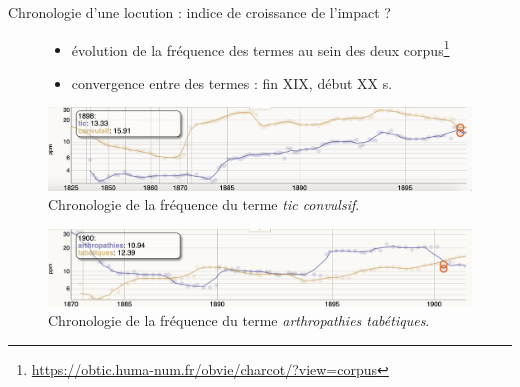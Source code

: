 \documentclass[xcolor={table,usenames,dvipsnames}]{beamer}
\let\olditem\item
\renewcommand{\item}{%
\olditem\vspace{0pt}}
\begin{document}
\begin{frame}{Chronologie d'une locution : indice de croissance de l'impact ?}
\begin{figure}[h] %
	\begin{itemize}
		\item évolution de la fréquence des termes au sein des deux corpus\footnote{\url{https://obtic.huma-num.fr/obvie/charcot/?view=corpus}}
		\item convergence entre des termes : fin \textsc{XIX}\ieme{}, début \textsc{XX}\ieme{} s.
	\end{itemize}
	\centering
	\includegraphics[width=\linewidth]{pic/tics_convulsifs.png}
	\caption{Chronologie de la fréquence du terme \textit{tic convulsif}.}
	\label{fig:ling_out_TAL}
\end{figure}

\begin{figure}[h]
	\includegraphics[width=\linewidth]{pic/arthropathies_tabetiques.png}
\caption{Chronologie de la fréquence du terme \textit{arthropathies tabétiques}.}
\label{fig:ling_out_TAL}
\end{figure}
\end{frame}
\end{document}
